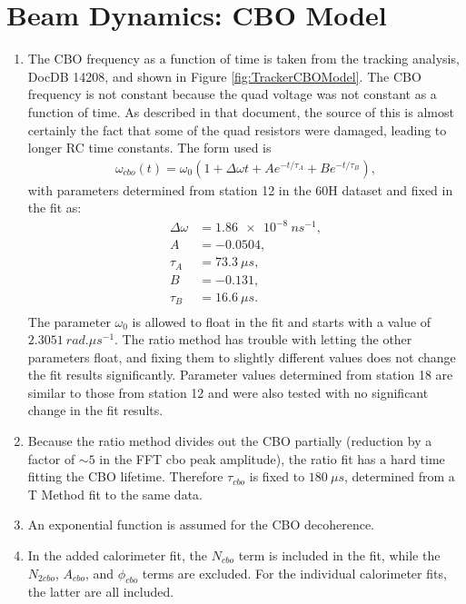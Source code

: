 \section{Beam Dynamics: CBO Model}
\label{Sec:CBO}

	\begin{enumerate}
		\item{The CBO frequency as a function of time is taken from the tracking analysis, DocDB 14208, and shown in Figure \ref{fig:TrackerCBOModel}. The CBO frequency is not constant because the quad voltage was not constant as a function of time. As described in that document, the source of this is almost certainly the fact that some of the quad resistors were damaged, leading to longer RC time constants. The form used is 
			\begin{gather}
				\omega_{cbo}(t) = \omega_{0}(1 + \Delta\omega t + A e^{-t/\tau_{A}} + B e^{-t/\tau_{B}}),
			\label{Eqn:CBOFreq}
			\end{gather}
		with parameters determined from station 12 in the 60H dataset and fixed in the fit as:
			\begin{equation*}	
			\begin{aligned}
			 	\Delta\omega &= \SI{1.86e-8}{ns^{-1}}, \\
			 	A &= -0.0504, \\
			 	\tau_{A} &= \SI{73.3}{\mu s}, \\
			 	B &= -0.131, \\
			 	\tau_{B} &= \SI{16.6}{\mu s}. \\
			\end{aligned}
			\end{equation*}
		The parameter $\omega_{0}$ is allowed to float in the fit and starts with a value of $\SI{2.3051}{rad.\mu s^{-1}}$. The ratio method has trouble with letting the other parameters float, and fixing them to slightly different values does not change the fit results significantly. Parameter values determined from station 18 are similar to those from station 12 and were also tested with no significant change in the fit results.}
		\item{Because the ratio method divides out the CBO partially (reduction by a factor of $\sim5$ in the FFT cbo peak amplitude), the ratio fit has a hard time fitting the CBO lifetime. Therefore $\tau_{cbo}$ is fixed to $\SI{180}{\mu s}$, determined from a T Method fit to the same data.}
		\item{An exponential function is assumed for the CBO decoherence.}
		\item{In the added calorimeter fit, the $N_{cbo}$ term is included in the fit, while the $N_{2cbo}$, $A_{cbo}$, and $\phi_{cbo}$ terms are excluded. For the individual calorimeter fits, the latter are all included.}

\end{enumerate}
